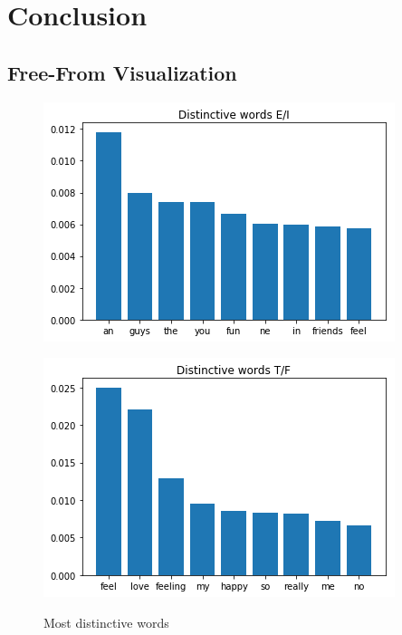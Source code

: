 \documentclass[12pt]{elsarticle}
\begin{document}
\clearpage
\section{Conclusion}
\subsection{Free-From Visualization}
\begin{figure}[ht]
\label{fig:words}
\caption{Most distinctive words}

\vspace{1em}
\centering
\begin{minipage}{0.48\textwidth}
  \centering
  {\includegraphics[width=.9\linewidth]{img/words_ie.png}}
\end{minipage}
\begin{minipage}{0.48\textwidth}
  \centering
  {\includegraphics[width=.9\linewidth]{img/words_tf.png}}
\end{minipage}

\vspace{1em}


\end{figure}
\end{document}
